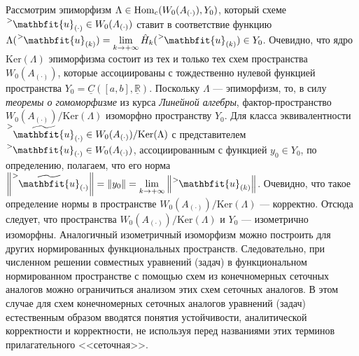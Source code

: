 Рассмотрим эпиморфизм $\Lambda \in \mathrm{Hom}_c(W_0(A_{(\cdot)}), Y_0)$, который схеме $\tensor[^{>}]{\mathbfit{u}}{_{(\cdot)}} \in W_0(A_{(\cdot)})$ ставит в соответствие функцию $\Lambda(\tensor[^{>}]{\mathbfit{u}}{_{(k)}}) = \lim\limits_{k \to +\infty}{\hat{H}_k(\tensor[^{>}]{\mathbfit{u}}{_{(k)}})} \in Y_0$. Очевидно, что ядро $\mathrm{Ker}(\Lambda)$ эпиморфизма состоит из тех и только тех схем пространства $W_0(A_{(\cdot)})$, которые ассоциированы с тождественно нулевой функцией пространства $Y_0 = \underline{C}([a, b], \underline{\mathbb{R}})$. Поскольку $\Lambda$ --- эпиморфизм, то, в силу \textit{теоремы о гомоморфизме} из курса \textit{Линейной алгебры}, фактор-пространство $W_0(A_{(\cdot)}) / \mathrm{Ker}(\Lambda)$ изоморфно пространству $Y_0$. Для класса эквивалентности $\tensor[^{>}]{\widetilde{\mathbfit{u}}}{_{(\cdot)}} \in W_0(A_{(\cdot)}) / \mathrm{Ker}(\Lambda)$ с представителем $\tensor[^{>}]{\mathbfit{u}}{_{(\cdot)}} \in W_0(A_{(\cdot)})$, ассоциированным с функцией $y_0 \in Y_0$, по определению, полагаем, что его норма $\norm{\tensor[^{>}]{\widetilde{\mathbfit{u}}}{_{(\cdot)}}} = \norm{y_0} = \lim\limits_{k \to +\infty}{\norm{\tensor[^{>}]{\mathbfit{u}}{_{(k)}}}}$. Очевидно, что такое определение нормы в пространстве $W_0(A_{(\cdot)})/\mathrm{Ker}(\Lambda)$ --- корректно. Отсюда следует, что пространства $W_0(A_{(\cdot)}) / \mathrm{Ker}(\Lambda)$ и $Y_0$ --- изометрично изоморфны. Аналогичный изометричный изоморфизм можно построить для других нормированных функциональных пространств. Следовательно, при численном решении совместных уравнений (задач) в функциональном нормированном пространстве с помощью схем из конечномерных сеточных аналогов можно ограничиться анализом этих схем сеточных аналогов. В этом случае для схем конечномерных сеточных аналогов уравнений (задач) естественным образом вводятся понятия устойчивости, аналитической корректности и корректности, не используя перед названиями этих терминов прилагательного <<сеточная>>.

